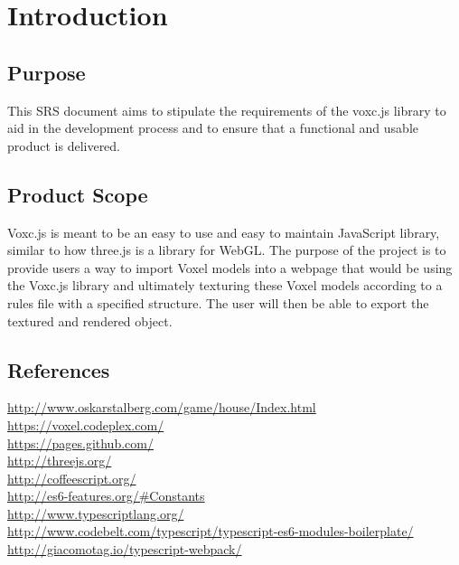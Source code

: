 \documentclass[english]{article}
\begin{document}
	\newpage
	\tableofcontents
	
	\newpage

	\section{Introduction}
	
		\subsection{Purpose}
		
		This SRS document aims to stipulate the requirements of the voxc.js library to aid in the development process and to ensure that a functional and usable product is delivered.
		
		\subsection{Product Scope}
		
		Voxc.js is meant to be an easy to use and easy to maintain JavaScript library, similar to how three.js is a library for WebGL. The purpose of the project is to provide users a way to import Voxel models into a webpage that would be using the Voxc.js library and ultimately texturing these Voxel models according to a rules file with a specified structure. The user will then be able to export the textured and rendered object.
		
		\subsection{References}
		
		\color{blue}
		\url{http://www.oskarstalberg.com/game/house/Index.html}
		\newline
		\\\url{https://voxel.codeplex.com/}
		\newline
		\\\url{https://pages.github.com/}
		\newline
		\\\url{http://threejs.org/}
		\newline
		\\\url{http://coffeescript.org/}
		\newline
		\\\url{http://es6-features.org/#Constants}
		\newline
		\\\url{http://www.typescriptlang.org/}
		\newline
		\\\url{http://www.codebelt.com/typescript/typescript-es6-modules-boilerplate/}
		\newline
		\\\url{http://giacomotag.io/typescript-webpack/}
		\color{black}
		
\end{document}
